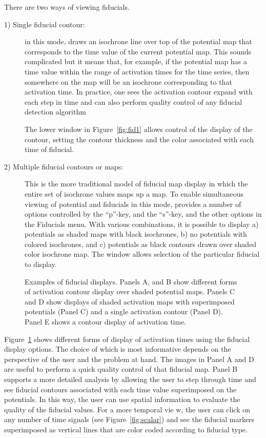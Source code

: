 There are two ways of viewing fiducials.
%
\begin{description}
  \item [1) Single fiducial contour: ] in this mode, \map{} draws an
    isochrone line over top of the potential map that corresponds to the
    time value of the current potential map.  This sounds complicated but
    it means that, for example, if the potential map has a time value
    within the range of activation times for the time series, then
    somewhere on the map will be an isochrone corresponding to that
    activation time.  In practice, one sees the activation contour 
    expand with each step in time and can also perform quality control of
    any fiducial detection algorithm
    
    The lower window in Figure~\ref{fig:fid1} allows control of the display
    of the contour, setting the contour thickness and the color associated
    with each time of fiducial.
    
  \item [2) Multiple fiducial contours or maps:] This is the more
    traditional model of fiducial map display in which the entire set of
    isochrone values maps up a map.  To enable simultaneous viewing of
    potential and fiducials in this mode, \map{} provides a number of
    options controlled by
    the ``p''-key, and the ``s''-key, and the other options in the Fiducials menu.  With various
    combinations, it is possible to display a) potentials as shaded maps
    with black isochrones, b) no potentials with colored isochrones, and c)
    potentials as black contours drawn over shaded color isochrone map.
    The window allows selection of the particular fiducial to display.
\end{description}

\begin{figure}[htb]
  \begin{makeimage}
  \end{makeimage}
  \fidexamples
  \caption{\label{fig:fidexamples} Examples of fiducial displays.  Panels
    A, and B show different forms of activation contour display over shaded
    potential maps.  Panels C and D show displays of shaded activation maps
    with superimposed potentials (Panel C) and a single activation contour
    (Panel D).  Panel E shows a contour display of activation time. }
\end{figure}


Figure~\ref{fig:fidexamples} shows different forms of display of activation
times using the fiducial display options.  The choice of which is most
informative depends on the perspective of the user and the problem at hand.
The images in Panel A and D are useful to perform a quick quality control
of that fiducial map.  Panel B supports a more detailed analysis by
allowing the user to step through time and see fiducial contours associated
with each time value superimposed on the potentials.  In this way, the user
can use spatial information to evaluate the quality of the fiducial values.
For a more temporal vie	w, the user can click on any number of time signals
(see Figure~\ref{fig:scalar}) and see the fiducial markers superimposed as
vertical lines that are color coded according to fiducial type.


